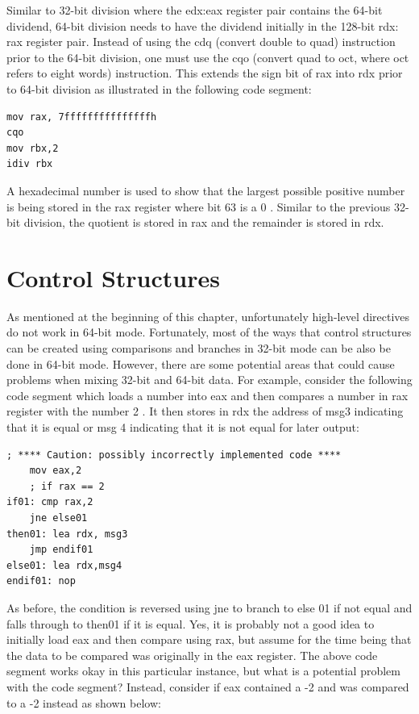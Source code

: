 \documentclass[10pt]{book}
\begin{document}
Similar to 32-bit division where the edx:eax register pair contains the 64-bit dividend, 64-bit division needs to have the dividend initially in the 128-bit rdx:\\
rax register pair. Instead of using the cdq (convert double to quad) instruction prior to the 64-bit division, one must use the cqo (convert quad to oct, where oct refers to eight words) instruction. This extends the sign bit of rax into rdx prior to 64-bit division as illustrated in the following code segment:


\begin{verbatim}
mov rax, 7fffffffffffffffh
cqo
mov rbx,2
idiv rbx
\end{verbatim}

A hexadecimal number is used to show that the largest possible positive number is being stored in the rax register where bit 63 is a 0 . Similar to the previous 32-bit division, the quotient is stored in rax and the remainder is stored in rdx.

\section{Control Structures}
As mentioned at the beginning of this chapter, unfortunately high-level directives do not work in 64-bit mode. Fortunately, most of the ways that control structures can be created using comparisons and branches in 32-bit mode can be also be done in 64-bit mode. However, there are some potential areas that could cause problems when mixing 32-bit and 64-bit data. For example, consider the following code segment which loads a number into eax and then compares a number in rax register with the number 2 . It then stores in rdx the address of msg3 indicating that it is equal or msg 4 indicating that it is not equal for later output:

\begin{verbatim}
; **** Caution: possibly incorrectly implemented code ****
    mov eax,2
    ; if rax == 2
if01: cmp rax,2
    jne else01
then01: lea rdx, msg3
    jmp endif01
else01: lea rdx,msg4
endif01: nop
\end{verbatim}

As before, the condition is reversed using jne to branch to else 01 if not equal and falls through to then01 if it is equal. Yes, it is probably not a good idea to initially load eax and then compare using rax, but assume for the time being that the data to be compared was originally in the eax register. The above code segment works okay in this particular instance, but what is a potential problem with the code segment? Instead, consider if eax contained a -2 and was compared to a -2 instead as shown below:
\end{document}
